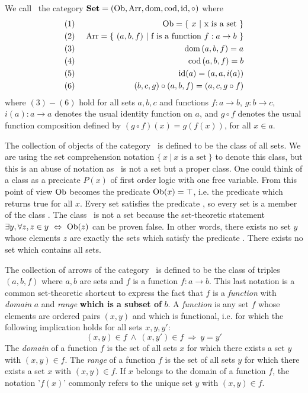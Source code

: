\begin{defin}\label{Cat:def:set}
    We call \Set\ the category $\mbox{\bf Set}=(\mbox{\rm Ob}, \mbox{\rm Arr}, \mbox{\rm dom}, \mbox{\rm cod}, \mbox{\rm id}, \circ)$ where
    \begin{eqnarray*}
        (1)&\ &\mbox{\rm Ob} = \{\ x\ |\  \mbox{x is a set}\ \}\\
        (2)&\ &\mbox{\rm Arr} = \{\ (a,b,f)\ |\  \mbox{f is a function $f : a\to b$}\ \}\\
        (3)&\ &\mbox{\rm dom}\,(a,b,f) = a\\
        (4)&\ &\mbox{\rm cod}\,(a,b,f) = b\\
        (5)&\ &\mbox{\rm id}(a) = (a,a,i(a))\\
        (6)&\ &(b,c,g)\circ(a,b,f) = (a,c,g\circ f)
    \end{eqnarray*}
    where $(3)-(6)$ hold for all sets $a,b,c$ and functions $f:a\to b$,
    $g:b\to c$, $i(a):a\to a$ denotes the usual identity function on $a$,
    and $g\circ f$ denotes the usual function composition defined by 
    $(g\circ f)(x)=g(f(x))$, for all $x\in a$.
\end{defin}
The collection of objects of the category \Set\ is defined to be the 
class of all sets. We are using the set comprehension notation 
$\{\ x\ |\ \mbox{$x$ is a set}\ \}$ to denote this class, but this is an
abuse of notation as \ob\ is not a set but a proper class. One could 
think of a class as a precicate $P(x)$ of first order logic with one
free variable. From this point of view $\mbox{\rm Ob}$ becomes the predicate
$\mbox{\rm Ob}(x)=\top$, i.e. the predicate which returns true for all $x$.
Every set satisfies the predicate \ob, so every set is a member of 
the class \ob. The class \ob\ is not a set because the set-theoretic
statement $\exists y, \forall z, z\in y\ \Leftrightarrow\ \ob(z)$
can be proven false. In other words, there exists no set $y$ whose
elements $z$ are exactly the sets which satisfy the predicate \ob.
There exists no set which contains all sets.

The collection of arrows of the category \Set\ is defined to be the 
class of triples $(a,b,f)$ where $a,b$ are sets and $f$ is a function
$f:a\to b$. This last notation is a common set-theoretic shortcut to
express the fact that $f$ is a {\em function} with {\em domain} $a$ and 
{\em range} {\bf which is a subset of} $b$. A {\em function} is any set $f$
whose elements are ordered pairs $(x,y)$ and which is functional, i.e.
for which the following implication holds for all sets $x,y,y'$:
    \[
        (x,y)\in f\ \land\ (x,y')\in f\ \Rightarrow\ y = y'
    \]
The {\em domain} of a function $f$ is the set of all sets $x$ for which there
exists a set $y$ with $(x,y)\in f$. The {\em range} of a function $f$ is the 
set of all sets $y$ for which there exists a set $x$ with $(x,y)\in f$.
If $x$ belongs to the domain of a function $f$, the notation '$f(x)$' commonly
refers to the unique set $y$ with $(x,y)\in f$. 

